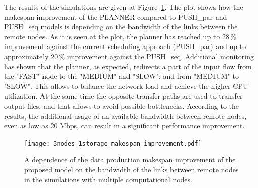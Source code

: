 \documentclass{svjour3}                     %
\begin{document}
The results of the simulations are given at Figure~\ref{multi_makespan_compare}. The plot shows how the makespan improvement of the PLANNER compared to PUSH\_par and PUSH\_seq models is depending on the bandwidth of the links between the remote nodes. As it is seen at the plot, the planner has reached up to 28\,\% improvement against the current scheduling approach (PUSH\_par) and up to approximately 20\,\% improvement against the PUSH\_seq. Additional monitoring has shown that the planner, as expected, redirects a part of the input flow from the "FAST" node to the "MEDIUM" and "SLOW"; and from "MEDIUM" to "SLOW". This allows to balance the network load and achieve the higher CPU utilization. At the same time the opposite transfer paths are used to transfer output files, and that allows to avoid possible bottlenecks. According to the results, the additional usage of an available bandwidth between remote nodes, even as low as 20 Mbps, can result in a significant performance improvement.
\begin{figure}
  \begin{center}
    \texttt{[image: 3nodes\_1storage\_makespan\_improvement.pdf]}
    \caption{A dependence of the data production makespan improvement of the proposed model on the bandwidth of the links between remote nodes in the simulations with multiple computational nodes. %
    }
      \label{multi_makespan_compare}	
  \end{center}  
\end{figure}
\end{document}
